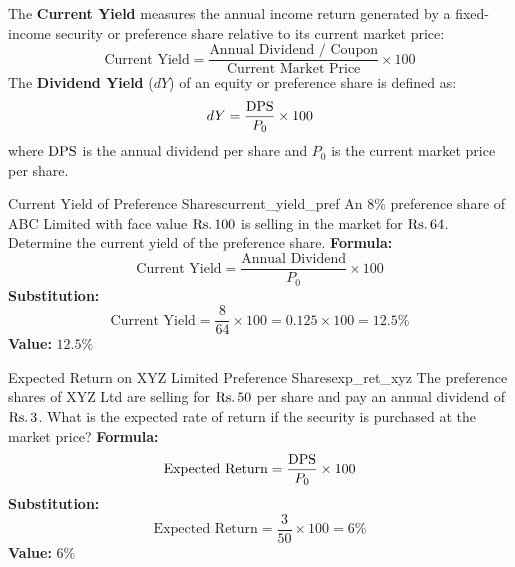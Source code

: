 \begin{formulabox}
The \textbf{Current Yield} measures the annual income return generated by a fixed-income security or preference share relative to its current market price:
\begin{equation}
    \text{Current Yield} = \frac{\text{Annual Dividend / Coupon}}{\text{Current Market Price}} \times 100
\end{equation}
The \textbf{Dividend Yield} ($dY$) of an equity or preference share is defined as:
\begin{equation}
    dY = \frac{\operatorname{DPS}}{P_0} \times 100
\end{equation}
where $\operatorname{DPS}$ is the annual dividend per share and $P_0$ is the current market price per share.
\end{formulabox}

\begin{example}{Current Yield of Preference Shares}{current_yield_pref}
An $8\%$ preference share of ABC Limited with face value $\text{Rs.}\, 100$ is selling in the market for $\text{Rs.}\, 64$. Determine the current yield of the preference share.
\tcblower
\textbf{Formula:}
\begin{equation*}
    \text{Current Yield} = \frac{\text{Annual Dividend}}{P_0} \times 100
\end{equation*}
\textbf{Substitution:}
\begin{equation*}
    \text{Current Yield} = \frac{8}{64} \times 100 = 0.125 \times 100 = 12.5\%
\end{equation*}
\textbf{Value:} $12.5\%$
\end{example}

\begin{example}{Expected Return on XYZ Limited Preference Shares}{exp_ret_xyz}
The preference shares of XYZ Ltd are selling for $\text{Rs.}\, 50$ per share and pay an annual dividend of $\text{Rs.}\, 3$. What is the expected rate of return if the security is purchased at the market price?
\tcblower
\textbf{Formula:}
\begin{equation*}
    \text{Expected Return} = \frac{\operatorname{DPS}}{P_0} \times 100
\end{equation*}
\textbf{Substitution:}
\begin{equation*}
    \text{Expected Return} = \frac{3}{50} \times 100 = 6\%
\end{equation*}
\textbf{Value:} $6\%$
\end{example}

